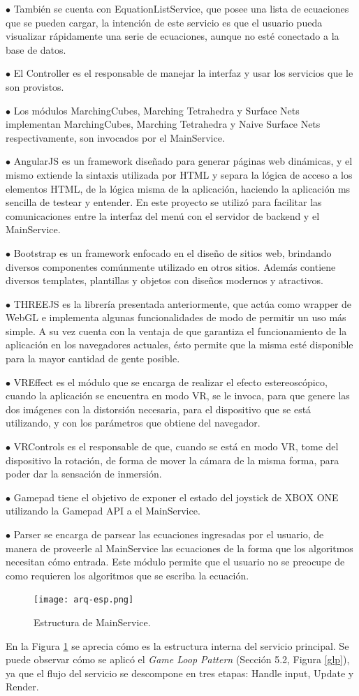 \documentclass[12pt]{article}
\begin{document}
$\bullet$ También se cuenta con EquationListService, que posee una lista de ecuaciones que se pueden cargar, la intención de este servicio es que el usuario pueda visualizar rápidamente una serie de ecuaciones, aunque no esté conectado a la base de datos.

$\bullet$ El Controller es el responsable de manejar la interfaz y usar los servicios que le son provistos.

$\bullet$ Los módulos MarchingCubes, Marching Tetrahedra y Surface Nets implementan MarchingCubes, Marching Tetrahedra y Naive Surface Nets respectivamente, son invocados por el MainService.

$\bullet$ AngularJS es un framework diseñado para generar páginas web dinámicas, y el mismo extiende la sintaxis utilizada por HTML y separa la lógica de acceso a los elementos HTML, de la lógica misma de la aplicación, haciendo la aplicación ms sencilla de testear y entender. En este proyecto se utilizó para facilitar las comunicaciones entre la interfaz del menú con el servidor de backend y el MainService.

$\bullet$ Bootstrap es un framework enfocado en el diseño de sitios web, brindando diversos componentes comúnmente utilizado en otros sitios. Además contiene diversos templates, plantillas y objetos con diseños modernos y atractivos. 

$\bullet$ THREEJS es la librería presentada anteriormente, que actúa como wrapper de WebGL e implementa algunas funcionalidades de modo de permitir un uso más simple. A su vez cuenta con la ventaja de que garantiza el funcionamiento de la aplicación en los navegadores actuales, ésto permite que la misma esté disponible para la mayor cantidad de gente posible.

$\bullet$ VREffect es el módulo que se encarga de realizar el efecto estereoscópico, cuando la aplicación se encuentra en modo VR, se le invoca, para que genere las dos imágenes con la distorsión necesaria, para el dispositivo que se está utilizando, y con los parámetros que obtiene del navegador.

$\bullet$ VRControls es el responsable de que, cuando se está en modo VR, tome del dispositivo la rotación, de forma de mover la cámara de la misma forma, para poder dar la sensación de inmersión.

$\bullet$ Gamepad tiene el objetivo de exponer el estado del joystick de XBOX ONE utilizando la Gamepad API\cite{gamepadapi} a el MainService.

$\bullet$ Parser se encarga de parsear las ecuaciones ingresadas por el usuario, de manera de proveerle al MainService las ecuaciones de la forma que los algoritmos necesitan cómo entrada. Este módulo permite que el usuario no se preocupe de como requieren los algoritmos que se escriba la ecuación.
\begin{figure}[h!]
\texttt{[image: arq-esp.png]}
\caption{Estructura de MainService.}
\label{arqMS}
\end{figure}
En la Figura \ref{arqMS} se aprecia cómo es la estructura interna del servicio principal. Se puede observar cómo se aplicó el \textit{Game Loop Pattern} (Sección 5.2, Figura \ref{glp}), ya que el flujo del servicio se descompone en tres etapas: Handle input, Update y Render.
\end{document}
